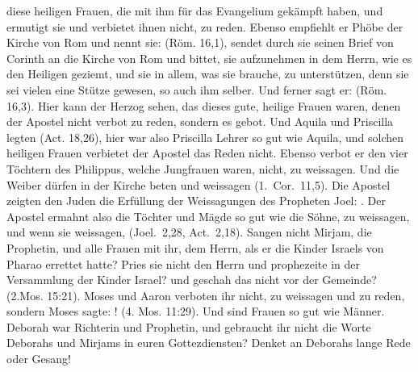{    diese heiligen Frauen, die mit ihm
    für das Evangelium gekämpft haben, und ermutigt sie und 
    verbietet ihnen nicht, zu reden. Ebenso empfiehlt er Phöbe der
    Kirche von Rom und nennt sie:  (Röm. 16,1), sendet 
    durch sie seinen Brief von Corinth
    an die Kirche von Rom und bittet, sie aufzunehmen in dem
    Herrn, wie es den Heiligen geziemt, und sie in allem, was sie
    brauche, zu unterstützen, denn sie sei vielen eine Stütze gewesen,
    so auch ihm selber. Und ferner sagt er:  
    (Röm. 16,3). Hier
    kann der Herzog sehen, das dieses gute, heilige Frauen waren,
    denen der Apostel nicht verbot zu reden, sondern es gebot.
    Und Aquila und Priscilla legten  (Act. 18,26), hier 
    war also Priscilla Lehrer so gut
    wie Aquila, und solchen heiligen Frauen verbietet der Apostel
    das Reden nicht. Ebenso verbot er den vier Töchtern des 
    Philippus, welche Jungfrauen waren, nicht, zu weissagen. Und die
    Weiber dürfen in der Kirche beten und weissagen 
    (1.~Cor.~11,5).
    Die Apostel zeigten den Juden die Erfüllung der Weissagungen
    des Propheten Joel: .
    Der Apostel ermahnt also die Töchter und Mägde so gut wie die
    Söhne, zu weissagen, und wenn sie weissagen,  
    (Joel.~2,28, 
    Act.~2,18). Sangen
    nicht Mirjam, die Prophetin, und alle Frauen mit ihr, dem Herrn,
    als er die Kinder Israels von Pharao errettet hatte? Pries sie
    nicht den Herrn und prophezeite in der Versammlung der Kinder
    Israel? und geschah das nicht vor der Gemeinde? 
    (2.Mos. 15:21).
    Moses und Aaron verboten ihr nicht, zu weissagen und zu reden,
    sondern Moses sagte: ! (4. Mos. 11:29). 
    Und  sind
    Frauen so gut wie Männer. Deborah war Richterin und Prophetin,
    und gebraucht ihr nicht die Worte Deborahs und Mirjams in euren
    Gottezdiensten? Denket an Deborahs lange Rede oder Gesang!
}
